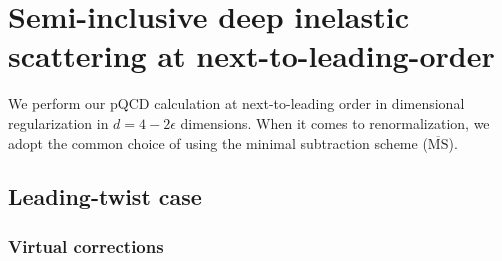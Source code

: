 \chapter{Semi-inclusive deep inelastic scattering at next-to-leading-order}

We perform our pQCD calculation at next-to-leading order in dimensional regularization in $d=4-2\epsilon$ dimensions. When it comes to renormalization, we adopt the common choice of using the minimal subtraction scheme ($\overline{\text{MS}}$).

\section{Leading-twist case}

\subsection{Virtual corrections}

